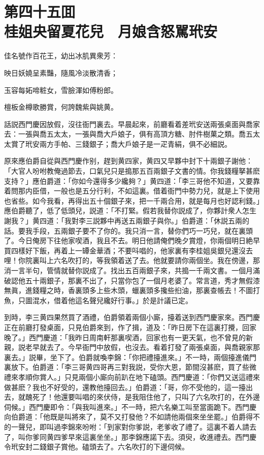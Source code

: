 
\chapter*{第四十五囬　\\桂姐央留夏花兒　月娘含怒駡玳安}


\begin{myquote}
佳名號作百花王，幼出冰肌異衆芳：

映日妖嬈呈素豔，隨風冷淡散清香；

玉容每妬啼粧女，雪臉渾如傅粉郎。

檀板金樽歌勝賞，何誇魏紫與姚黄。
\end{myquote}

話説西門慶因放假，沒往衙門裏去。早晨起來，前廳看着差玳安送兩張桌面與喬家去：一張與喬五太太，一張與喬大戶娘子，俱有高頂方糖、肘件樹菓之類。喬五太太賞了玳安兩方手帕、三錢銀子；喬大戶娘子是一疋青絹，俱不必細説。

原來應伯爵自從與西門慶作别，趕到黄四家，黄四又早夥中封下十兩銀子謝他：「大官人吩咐教俺過節去，口氣兒只是搗那五百兩銀子文書的情。你我錢糧拏甚麽支持？」應伯爵道：「你如今還得多少纔夠？」黄四道：「李三哥他不知道，又要靠着問那内臣借，一般也是五分行利，不如這裏。借着衙門中勢力兒，就是上下使用也省些。如今我看，再得出五十個銀子來，把一千兩合用，就是每月也好認利錢。」應伯爵聽了，低了低頭兒，説道：「不打緊。假若我替你説成了，你夥計衆人怎生謝我？」黄四道：「我對李三説夥中再送五兩銀子與你。」伯爵道：「休説五兩的話。要我手段，五兩銀子要不了你的。我只消一言，替你們巧一巧兒，就在裏頭了。今日俺房下往他家喫酒，我且不去。明日他請俺們晚夕賞燈，你兩個明日絶早買四樣好下飯，再着上一罈金華酒；不要呌唱的，他家裏有李桂姐吳銀兒還沒去哩！你院裏叫上六名吹打的，等我領着送了去。他就要請你兩個坐。我在傍邊，那消一言半句，管情就替你説成了。找出五百兩銀子來，共搗一千兩文書。一個月滿破認他五十兩銀子，那裏不出了，只當你包了一個月老婆了。常言道，秀才無假漆無眞，進錢糧之時，香裏頭多上些木頭，蠟裏頭多攙些㧮油，那裏查帳去！不圖打魚，只圖混水，借着他這名聲兒纔好行事。」於是計議已定。

到時，李三黄四果然買了酒禮，伯爵領着兩個小廝，擡着送到西門慶家來。西門慶正在前廳打發桌面，只見伯爵來到，作了揖，道及：「昨日房下在這裏打攪，回家晚了。」西門慶道：「我昨日周南軒那裏喫酒，回家也有一更天氣，也不曾見的新親，説老早就去了。今早衙門中放假，也沒去。看着打發了兩張桌面，與喬親家那裏去。」説畢，坐下了。伯爵就喚李錦：「你把禮擡進來。」不一時，兩個擡進儀門裏放下。伯爵道：「李三哥黄四哥再三對我説，受你大恩，節間沒甚麽，買了些微禮來孝順你賞人。」只見兩個小廝向前趴在地下磕頭。西門慶道：「你們又送這禮來做甚麽？我也不好受的，還教他擡回去。」伯爵道：「哥，你不受他的，這一擡出去，就醜死了！他還要叫唱的來伏侍，是我阻住他了，只叫了六名吹打的，在外邊伺候。」西門慶即令：「與我叫進來。」不一時，把六名樂工叫至當面跪下。西門慶向伯爵道：「他既是叫將來了，莫不又打發他？不如請他兩個來坐坐罷。」伯爵得不的一聲兒，即叫過李錦來吩咐：「到家對你爹説，老爹收了禮了。這裏不着人請去了，叫你爹同黄四爹早來這裏坐坐。」那李錦應諾下去。須臾，收進禮去。西門慶令玳安封二錢銀子賞他。磕頭去了。六名吹打的下邊伺候。

